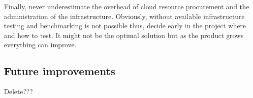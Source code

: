 Finally, never underestimate the overhead of cloud resource procurement and the administration of the infrastructure. Obviously, without available infrastructure testing and benchmarking is not possible thus, decide early in the project where and how to test. It might not be the optimal solution but as the product grows everything can improve.

\subsection{Future improvements}\label{future-improvements}

Delete???
